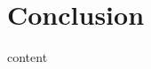 \documentclass[electronic]{vgtc}             %
\begin{document}
\section{Conclusion}
content

%
%
%

%


\end{document}
